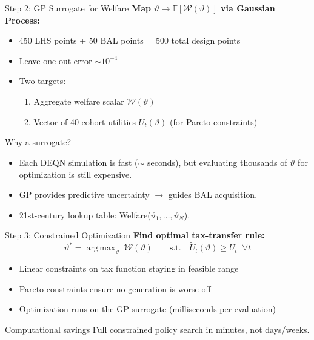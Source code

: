 \documentclass[aspectratio=169,11pt]{beamer}
\newcommand{\emphc}[1]{\textcolor{harvardcrimson}{#1}}
\DeclareMathOperator*{\argmax}{arg\,max}
\begin{document}
\begin{frame}{Step 2: GP Surrogate for Welfare}
\small
\textbf{Map $\vartheta \rightarrow \mathbb{E}[\mathcal{W}(\vartheta)]$ via Gaussian Process:}
\begin{itemize}
    \item 450 LHS points + 50 BAL points = 500 total design points
    \item Leave-one-out error $\sim 10^{-4}$
    \item Two targets:
    \begin{enumerate}
        \item Aggregate welfare scalar $\mathcal{W}(\vartheta)$
        \item Vector of 40 cohort utilities $\tilde{U}_t(\vartheta)$ (for Pareto constraints)
    \end{enumerate}
\end{itemize}

\vspace{0.2cm}
\begin{block}{Why a surrogate?}
\begin{itemize}
    \item Each DEQN simulation is fast ($\sim$ seconds), but evaluating thousands of $\vartheta$ for optimization is still expensive.
    \item GP provides \emphc{predictive uncertainty} $\rightarrow$ guides BAL acquisition.
    \item 21st-century lookup table: Welfare($\vartheta_1, \ldots, \vartheta_N$).
\end{itemize}
\end{block}
\end{frame}

\begin{frame}{Step 3: Constrained Optimization}
\small
\textbf{Find optimal tax-transfer rule:}
\[
\vartheta^* = \argmax_\vartheta \; \mathcal{W}(\vartheta) \qquad \text{s.t.} \quad \tilde{U}_t(\vartheta) \geq U_t \;\; \forall t
\]

\begin{itemize}
    \item Linear constraints on tax function staying in feasible range
    \item Pareto constraints ensure no generation is worse off
    \item Optimization runs on the \emphc{GP surrogate} (milliseconds per evaluation)
\end{itemize}

\vspace{0.2cm}
\begin{alertblock}{Computational savings}
Full constrained policy search in minutes, not days/weeks.
\end{alertblock}
\end{frame}
\end{document}
